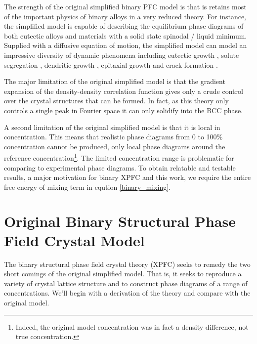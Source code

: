 \documentclass[showkeys, prb, reprint]{revtex4-1}
\begin{document}
The strength of the original simplified binary PFC model is that is retains
most of the important physics of binary alloys in a very reduced theory. For
instance, the simplified model is capable of describing the equilibrium phase
diagrams of both eutectic alloys and materials with a solid state spinodal /
liquid minimum.  Supplied with a diffusive equation of motion, the simplified
model can model an impressive diversity of dynamic phenomena including eutectic
growth \cite{ELDER07}, solute segregation \cite{STOLLE14}, dendritic growth
\cite{ELDER07}, epitaxial growth \cite{ELDER10_NANOISLAND, LU16} and crack
formation \cite{HU17}.

The major limitation of the original simplified model is that the gradient
expansion of the density-density correlation function gives only a crude
control over the crystal structures that can be formed. In fact, as this theory
only controls a single peak in Fourier space it can only solidify into the BCC
phase.

A second limitation of the original simplified model is that it is local in
concentration. This means that realistic phase diagrams from 0 to 100\%
concentration cannot be produced, only local phase diagrams around the
reference concentration\footnote{Indeed, the original model concentration was
in fact a density difference, not true concentration.}. The limited
concentration range is problematic for comparing to experimental phase
diagrams. To obtain relatable and testable results, a major motivation for
binary XPFC and this work, we require the entire free energy of mixing term in
eqution \ref{binary_mixing}.

\section{Original Binary Structural Phase Field Crystal Model} %

The binary structural phase field crystal theory (XPFC) seeks to remedy the two
short comings of the original simplified model. That is, it seeks to reproduce
a variety of crystal lattice structure and to construct  phase diagrams of a
range of concentrations. We'll begin with a derivation of the theory and
compare with the original model.
\end{document}
